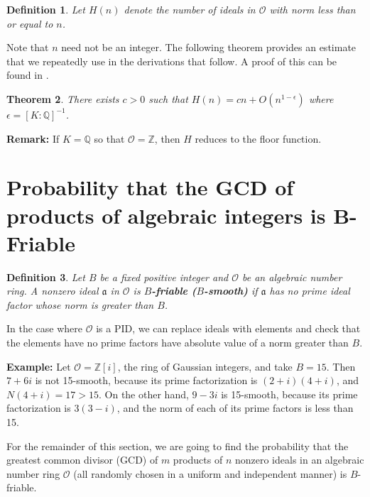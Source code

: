 \documentclass[12pt]{amsart}
\newtheorem{theorem}{Theorem}[subsection]
\newtheorem{definition}[theorem]{Definition}
\theoremstyle{definition}
\begin{document}
\begin{definition} \label{H}
	Let $H(n)$ denote the number of ideals in $\mathcal{O}$ with norm less than or equal to $n$.
\end{definition}

Note that $n$ need not be an integer. The following theorem provides an estimate that we repeatedly use in the derivations that follow. A proof of this can be found in \cite{Marcus}.

\begin{theorem} There exists $c > 0$ such that $H(n)=cn+O(n^{1-\epsilon})$ where $\epsilon = [K : \mathbb{Q}]^{-1}$. \label{H-estimate}
\end{theorem}

\noindent \textbf{Remark:} If $K=\mathbb{Q}$ so that $\mathcal{O} = \mathbb{Z}$, then $H$ reduces to the floor function. 

\section{Probability that the GCD of products of algebraic integers is B-Friable}

\begin{definition} Let $B$ be a fixed positive integer and $\mathcal{O}$ be an algebraic number ring. A nonzero ideal $\mathfrak{a}$ in $\mathcal{O}$ is \textbf{$B$-friable ($B$-smooth)} if $\mathfrak{a}$ has no prime ideal factor whose norm is greater than $B$. 
\end{definition}

In the case where $\mathcal{O}$ is a PID, we can replace ideals with elements and check that the elements have no prime factors have absolute value of a norm greater than $B$.

\noindent \textbf{Example:} Let $\mathcal{O} = \mathbb{Z}[i]$, the ring of Gaussian integers, and take $B =  15$. Then $7 + 6i$ is not 15-smooth, because its prime factorization is $(2+i)(4+i)$, and $N(4+i) = 17 > 15$. On the other hand, $9-3i$ is 15-smooth, because its prime factorization is $3(3 - i)$, and the norm of each of its prime factors is less than 15.

For the remainder of this section, we are going to find the probability that the greatest common divisor (GCD) of $m$ products of $n$ nonzero ideals in an algebraic number ring $\mathcal{O}$ (all randomly chosen in a uniform and independent manner) is $B$-friable. 

\vspace{.1 in}
\end{document}
